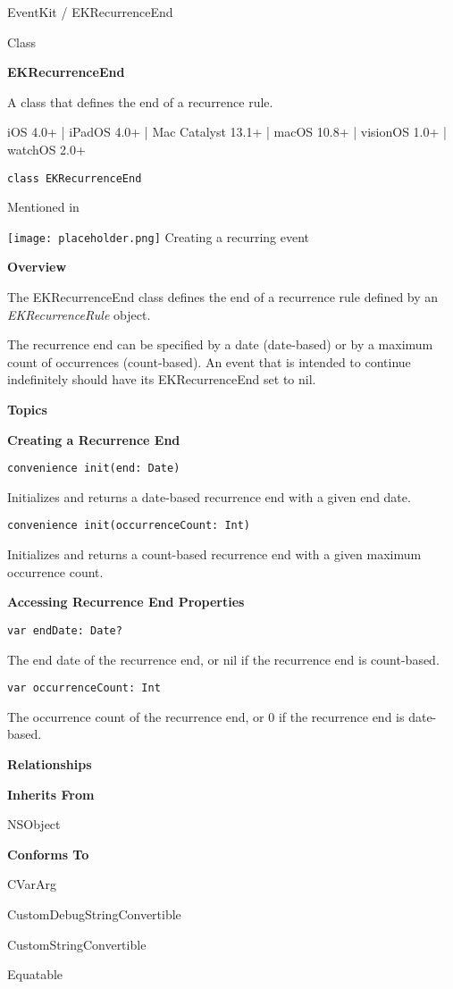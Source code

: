 \documentclass{article}
\title{}
\author{}
\date{}
\begin{document}
EventKit / EKRecurrenceEnd

Class

\textbf{EKRecurrenceEnd}

A class that defines the end of a recurrence rule.

iOS 4.0+ | iPadOS 4.0+ | Mac Catalyst 13.1+ | macOS 10.8+ | visionOS 1.0+ | watchOS 2.0+

\texttt{class EKRecurrenceEnd}

Mentioned in

\texttt{[image: placeholder.png]} Creating a recurring event

\textbf{Overview}

The EKRecurrenceEnd class defines the end of a recurrence rule defined by an \textit{EKRecurrenceRule} object.

The recurrence end can be specified by a date (date-based) or by a maximum count of occurrences (count-based). An event that is intended to continue indefinitely should have its EKRecurrenceEnd set to nil.

\textbf{Topics}

\textbf{Creating a Recurrence End}

\texttt{convenience init(end: Date)}

Initializes and returns a date-based recurrence end with a given end date.

\texttt{convenience init(occurrenceCount: Int)}

Initializes and returns a count-based recurrence end with a given maximum occurrence count.

\textbf{Accessing Recurrence End Properties}

\texttt{var endDate: Date?}

The end date of the recurrence end, or nil if the recurrence end is count-based.

\texttt{var occurrenceCount: Int}

The occurrence count of the recurrence end, or 0 if the recurrence end is date-based.

\textbf{Relationships}

\textbf{Inherits From}

NSObject

\textbf{Conforms To}

CVarArg

CustomDebugStringConvertible

CustomStringConvertible

Equatable
\end{document}
